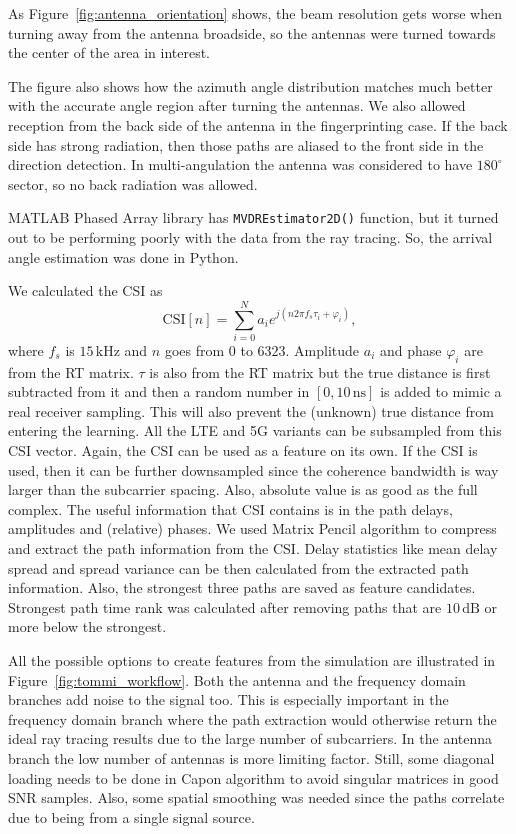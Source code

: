 As Figure~\ref{fig:antenna_orientation} shows, the beam resolution gets worse when turning
away from the antenna broadside, so the antennas were turned towards the center of the
area in interest.

The figure also shows how the azimuth angle distribution matches much better with the
accurate angle region after turning the antennas. We also allowed reception from the back
side of the antenna in the fingerprinting case. If the back side has strong radiation, then
those paths are aliased to the front side in the direction detection. In multi-angulation
the antenna was considered to have $180^\circ$ sector, so no back radiation was allowed.

MATLAB Phased Array library has \texttt{MVDREstimator2D()} function, but it turned out to
be performing poorly with the data from the ray tracing. So, the arrival angle estimation
was done in Python.

We calculated the CSI as
\begin{equation}
  \text{CSI}[n] = \sum_{i=0}^{N} a_i e^{j(n 2\pi f_s \tau_i + \varphi_i)},
\end{equation}
where $f_s$ is $15\,\text{kHz}$ and $n$ goes from $0$ to $6323$. Amplitude $a_i$ and phase
$\varphi_i$ are from the RT matrix. $\tau$ is also from the RT matrix but the true distance
is first subtracted from it and then a random number in $[0, 10\,\text{ns}]$ is added to mimic
a real receiver sampling. This will also prevent the (unknown) true distance from entering
the learning. All the LTE and 5G variants can be subsampled from this CSI vector. Again,
the CSI can be used as a feature on its own. If the CSI is used, then it can be further
downsampled since the coherence bandwidth is way larger than the subcarrier spacing. Also,
absolute value is as good as the full complex. The useful information that CSI contains is
in the path delays, amplitudes and (relative) phases. We used Matrix Pencil algorithm to
compress and extract the path information from the CSI. Delay statistics like mean delay
spread and spread variance can be then calculated from the extracted path information. Also,
the strongest three paths are saved as feature candidates. Strongest path time rank was
calculated after removing paths that are $10\,\text{dB}$ or more below the strongest.

All the possible options to create features from the simulation are illustrated in
Figure~\ref{fig:tommi_workflow}. Both the antenna and the frequency domain branches add
noise to the signal too. This is especially important in the frequency domain branch where
the path extraction would otherwise return the ideal ray tracing results due to the large
number of subcarriers. In the antenna branch the low number of antennas is more limiting
factor. Still, some diagonal loading needs to be done in Capon algorithm to avoid singular
matrices in good SNR samples. Also, some spatial smoothing was needed since the paths
correlate due to being from a single signal source. 

